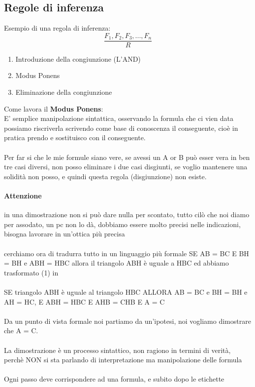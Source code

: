 \documentclass[12pt, a4paper, openany, oneside]{book}
\begin{document}
{\subsection{Regole di inferenza}
Esempio di una regola di inferenza:
\[
\frac{F_{1}, F_{2}, F_{3}, ..., F_{n}}{R}
\]
\begin{enumerate}
	\item Introduzione della congiunzione (L'AND)
	\item Modus Ponens
	\item Eliminazione della congiunzione
\end{enumerate}
Come lavora il \textbf{Modus Ponens}: \\
E' semplice manipolazione sintattica, osservando la formula che ci vien data
possiamo riscriverla scrivendo come base di conoscenza il conseguente, 
cioè in pratica prendo e sostituisco con il conseguente.
\\ \\
Per far si che le mie formule siano vere, se avessi un A or B può esser vera in 
ben tre casi diversi, non posso eliminare i due casi disgiunti, se voglio 
mantenere una solidità non posso, e quindi questa regola (disgiunzione) non 
esiste.
\paragraph{Attenzione} in una dimostrazione non si può dare nulla per 
scontato, tutto cilò che noi diamo per assodato, un pc non lo dà, dobbiamo 
essere molto precisi nelle indicazioni, bisogna lavorare in un'ottica più 
precisa
\\ \\
cerchiamo ora di tradurra tutto in un linguaggio più formale
SE AB = BC E BH = BH e ABH = HBC allora il triangolo ABH è uguale a HBC 
ed abbiamo trasformato (1) in \\ \\
SE triangolo ABH è uguale al triangolo HBC ALLORA AB = BC e BH = BH e AH = HC,
E ABH = HBC E AHB = CHB E A = C
\\ \\
Da un punto di vista formale noi partiamo da un'ipotesi, noi vogliamo 
dimostrare che A = C.
\\ \\
La dimostrazione è un processo sintattico, non ragiono in termini di verità, 
perchè NON si sta parlando di interpretazione ma manipolazione delle formula
\\ \\
Ogni passo deve corrispondere ad una formula, e subito dopo le etichette
}
\end{document}
